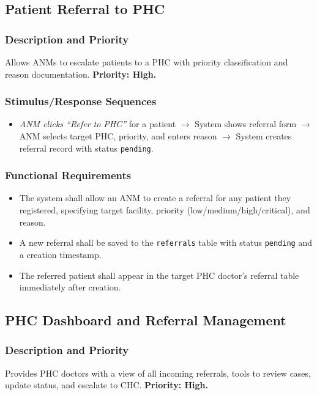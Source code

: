 \documentclass[12pt,a4paper]{article}
\begin{document}
\subsection{Patient Referral to PHC}

\subsubsection{Description and Priority}
Allows ANMs to escalate patients to a PHC with priority classification and reason documentation. \textbf{Priority: High.}

\subsubsection{Stimulus/Response Sequences}
\begin{itemize}
    \item \textit{ANM clicks ``Refer to PHC''} for a patient $\rightarrow$ System shows referral form $\rightarrow$ ANM selects target PHC, priority, and enters reason $\rightarrow$ System creates referral record with status \texttt{pending}.
\end{itemize}

\subsubsection{Functional Requirements}
\begin{itemize}
    \item[\texttt{REQ-REF-01}] The system shall allow an ANM to create a referral for any patient they registered, specifying target facility, priority (low/medium/high/critical), and reason.
    \item[\texttt{REQ-REF-02}] A new referral shall be saved to the \texttt{referrals} table with status \texttt{pending} and a creation timestamp.
    \item[\texttt{REQ-REF-03}] The referred patient shall appear in the target PHC doctor's referral table immediately after creation.
\end{itemize}

\subsection{PHC Dashboard and Referral Management}

\subsubsection{Description and Priority}
Provides PHC doctors with a view of all incoming referrals, tools to review cases, update status, and escalate to CHC. \textbf{Priority: High.}
\end{document}
